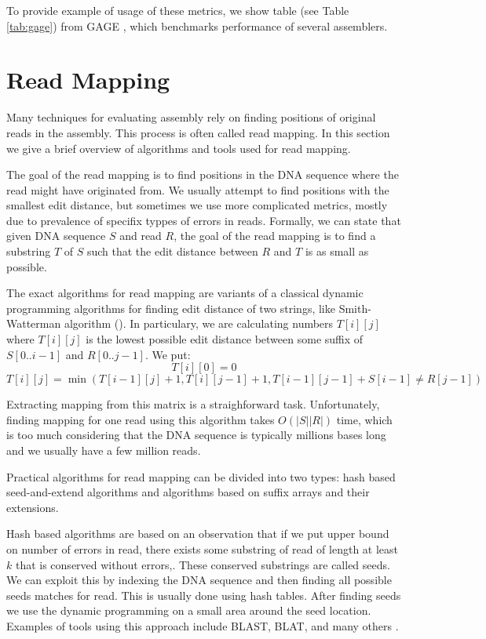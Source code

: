 To provide example of usage of these metrics, we show table (see Table \ref{tab:gage}) from GAGE \citep{gage}, which
benchmarks performance of several assemblers.

\section{Read Mapping}

Many techniques for evaluating assembly rely on finding
positions of original reads in the assembly. This process is often called read mapping.
In this section we give a brief  overview of algorithms and tools used for read mapping.

The goal of the read mapping is to find positions in the DNA sequence where the read might have
originated from. We usually attempt to find positions with the smallest edit distance, 
but sometimes we use more complicated metrics, mostly due to prevalence of specifix typpes of errors in reads.
Formally, we can state that given DNA sequence $S$ and read $R$, the goal of the read mapping
is to find a substring $T$ of $S$ such that the edit distance between $R$ and $T$ is as small as possible.

The exact algorithms for read mapping are variants of a classical dynamic programming algorithms
for finding edit distance of two strings, like Smith-Watterman algorithm (\cite{sm}).
In particulary, we are calculating numbers $T[i][j]$ where $T[i][j]$ is the lowest possible edit
distance between some suffix of $S[0..i-1]$ and $R[0..j-1]$. 
We put:
$$T[i][0] = 0$$
$$T[i][j] = \min(T[i-1][j] + 1, T[i][j-1] + 1, T[i-1][j-1] + S[i-1] \neq R[j-1])$$

Extracting mapping from this matrix is a straighforward task.
Unfortunately, finding mapping for one read using this algorithm takes $O(|S||R|)$ time,
which is too much considering that the DNA sequence is typically millions bases long and we usually have
a few million reads.

Practical algorithms for read mapping can be divided into two types:
hash based seed-and-extend algorithms and algorithms based on suffix arrays and their extensions.

Hash based algorithms are based on an observation that if we put upper bound on number
of errors in read, there exists
some substring of read of length at least $k$ that is conserved without errors,.
These conserved substrings are called seeds. 
We can exploit this by indexing the DNA sequence 
and then finding all possible seeds matches for read.
This is usually done using hash tables. After finding seeds we use the
dynamic programming on a small area around the seed location.
Examples of tools using this approach 
include BLAST, BLAT, and many others \citep{blast,blat}.

